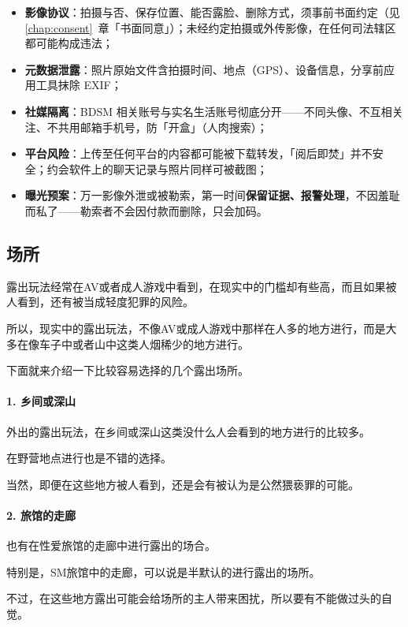 \documentclass[12pt,UTF8]{ctexbook}
\begin{document}
\begin{itemize}
\item \textbf{影像协议}：拍摄与否、保存位置、能否露脸、删除方式，须事前书面约定（见\ref{chap:consent}~章「书面同意」）；未经约定拍摄或外传影像，在任何司法辖区都可能构成违法；
\item \textbf{元数据泄露}：照片原始文件含拍摄时间、地点（GPS）、设备信息，分享前应用工具抹除 EXIF；
\item \textbf{社媒隔离}：BDSM 相关账号与实名生活账号彻底分开——不同头像、不互相关注、不共用邮箱手机号，防「开盒」（人肉搜索）；
\item \textbf{平台风险}：上传至任何平台的内容都可能被下载转发，「阅后即焚」并不安全；约会软件上的聊天记录与照片同样可被截图；
\item \textbf{曝光预案}：万一影像外泄或被勒索，第一时间\textbf{保留证据、报警处理}，不因羞耻而私了——勒索者不会因付款而删除，只会加码。
\end{itemize}

\subsection{场所}

露出玩法经常在AV或者成人游戏中看到，在现实中的门槛却有些高，而且如果被人看到，还有被当成轻度犯罪的风险。

所以，现实中的露出玩法，不像AV或成人游戏中那样在人多的地方进行，而是大多在像车子中或者山中这类人烟稀少的地方进行。

下面就来介绍一下比较容易选择的几个露出场所。

\paragraph{1. 乡间或深山}

外出的露出玩法，在乡间或深山这类没什么人会看到的地方进行的比较多。

在野营地点进行也是不错的选择。

当然，即便在这些地方被人看到，还是会有被认为是公然猥亵罪的可能。

\paragraph{2. 旅馆的走廊}

也有在性爱旅馆的走廊中进行露出的场合。

特别是，SM旅馆中的走廊，可以说是半默认的进行露出的场所。

不过，在这些地方露出可能会给场所的主人带来困扰，所以要有不能做过头的自觉。
\end{document}
